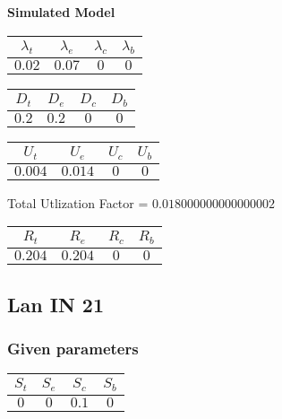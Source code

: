 \documentclass{article}
\begin{document}
\begin{minipage}{0.5\textwidth}
\centering	\textbf{Simulated Model}
\begin{table}[H]
\centering
\begin{tabular}{@{}cccc@{}}
\toprule
$\lambda_t$ & $\lambda_e$ & $\lambda_c$ & $\lambda_b$\\
\midrule
$0.02$ & $0.07$ & $0$ & $0$\\
\bottomrule
\end{tabular}
\end{table}
\begin{table}[H]
\centering
\begin{tabular}{@{}cccc@{}}
\toprule
$D_t$ & $D_e$ & $D_c$ & $D_b$\\
\midrule
$0.2$ & $0.2$ & $0$ & $0$\\
\bottomrule
\end{tabular}
\end{table}\begin{table}[H]
\centering
\begin{tabular}{@{}cccc@{}}
\toprule
$U_t$ & $U_e$ & $U_c$ & $U_b$\\
\midrule
$0.004$ & $0.014$ & $0$ & $0$\\
\bottomrule
\end{tabular}
\end{table}
\centering Total Utlization Factor = $0.018000000000000002$
\begin{table}[H]
\centering
\begin{tabular}{@{}cccc@{}}
\toprule
$R_t$ & $R_e$ & $R_c$ & $R_b$\\
\midrule
$0.204$ & $0.204$ & $0$ & $0$\\
\bottomrule
\end{tabular}
\end{table}
\end{minipage}\subsection{Lan IN 21}
\subsubsection{Given parameters}
\begin{table}[H]
\centering
\begin{tabular}{@{}cccc@{}}
\toprule
$S_t$ & $S_e$ & $S_c$ & $S_b$\\
\midrule
$0$ & $0$ & $0.1$ & $0$\\
\bottomrule
\end{tabular}
\end{table}
\end{document}
